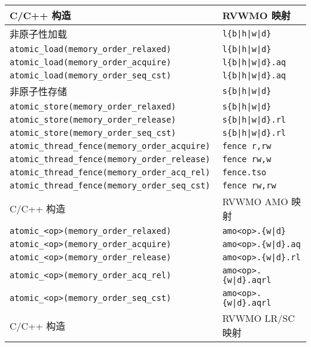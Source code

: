 \begin{table}[h!]
  \centering
  \begin{tabular}{|l|l|}
    \hline
    C/C++ 构造                            & RVWMO 映射 \\
    \hline
    \hline
    非原子性加载                            & \tt l\{b|h|w|d\}               \\
    \hline
    \tt atomic\_load(memory\_order\_relaxed)   & \tt l\{b|h|w|d\}               \\
    \hline
    \tt atomic\_load(memory\_order\_acquire)   & \tt l\{b|h|w|d\}.aq  \\
    \hline
    \tt atomic\_load(memory\_order\_seq\_cst)  & \tt l\{b|h|w|d\}.aq  \\
    \hline
    \hline
    非原子性存储                          & \tt s\{b|h|w|d\}               \\
    \hline
    \tt atomic\_store(memory\_order\_relaxed)  & \tt s\{b|h|w|d\}               \\
    \hline
    \tt atomic\_store(memory\_order\_release)  & \tt s\{b|h|w|d\}.rl  \\
    \hline
    \tt atomic\_store(memory\_order\_seq\_cst) & \tt s\{b|h|w|d\}.rl \\
    \hline
    \hline
    \tt atomic\_thread\_fence(memory\_order\_acquire)  & \tt fence r,rw \\
    \hline
    \tt atomic\_thread\_fence(memory\_order\_release)  & \tt fence rw,w \\
    \hline
    \tt atomic\_thread\_fence(memory\_order\_acq\_rel) & {\tt fence.tso} \\
    \hline
    \tt atomic\_thread\_fence(memory\_order\_seq\_cst) & \tt fence rw,rw \\
    \hline
    \hline
    C/C++ 构造                           & RVWMO AMO 映射    \\
    \hline
    \tt atomic\_<op>(memory\_order\_relaxed)  & \tt amo<op>.\{w|d\}      \\
    \hline
    \tt atomic\_<op>(memory\_order\_acquire)  & \tt amo<op>.\{w|d\}.aq   \\
    \hline
    \tt atomic\_<op>(memory\_order\_release)  & \tt amo<op>.\{w|d\}.rl   \\
    \hline
    \tt atomic\_<op>(memory\_order\_acq\_rel) & \tt amo<op>.\{w|d\}.aqrl \\
    \hline
    \tt atomic\_<op>(memory\_order\_seq\_cst) & \tt amo<op>.\{w|d\}.aqrl \\
    \hline
    \hline
    C/C++ 构造                           & RVWMO LR/SC 映射\\

\end{tabular}
\end{table}
